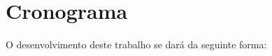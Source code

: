 
\chapter{Cronograma}
\label{chap:cronograma}

\noindent\hrulefill

O desenvolvimento deste trabalho se dará da seguinte forma:

